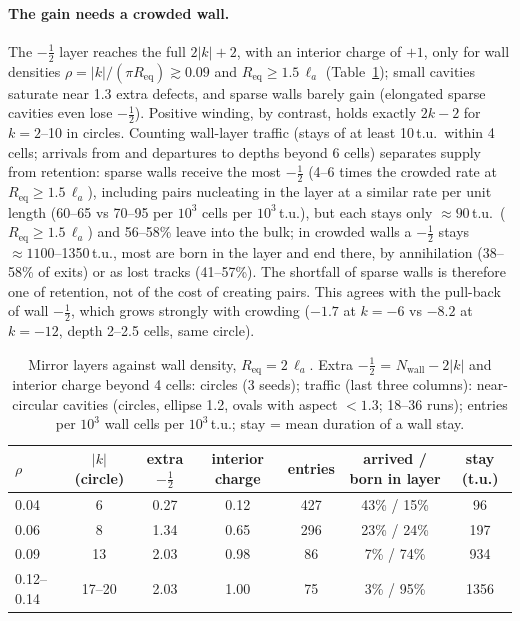 \documentclass[aps,prl,onecolumn,superscriptaddress,amsmath,amssymb,nofootinbib]{revtex4-2}
\newcommand{\half}{\tfrac12}
\newcommand{\la}{\ell_a}
\begin{document}
\paragraph{The gain needs a crowded wall.} The $-\half$ layer reaches the full $2|k|+2$, with an interior charge of $+1$, only for wall densities
$\rho=|k|/(\pi R_\mathrm{eq})\gtrsim0.09$ and $R_\mathrm{eq}\geq1.5\,\la$ (Table~\ref{tab:mirror_rho}); small cavities saturate near 1.3 extra defects, and sparse walls
barely gain (elongated sparse cavities even lose $-\half$). Positive winding, by contrast, holds exactly $2k-2$ for $k=2$--10 in circles. Counting wall-layer traffic
(stays of at least 10\,t.u.\ within 4 cells; arrivals from and departures to depths beyond 6 cells) separates supply from retention: sparse walls receive the
most $-\half$ (4--6 times the crowded rate at $R_\mathrm{eq}\geq1.5\,\la$), including pairs nucleating in the layer at a similar rate per unit length (60--65 vs 70--95 per
$10^3$ cells per $10^3$\,t.u.), but each stays only $\approx90$\,t.u.\ ($R_\mathrm{eq}\geq1.5\,\la$) and 56--58\% leave into the bulk; in crowded walls a $-\half$ stays $\approx1100$--1350\,t.u., most
are born in the layer and end there, by annihilation (38--58\% of exits) or as lost tracks (41--57\%). The shortfall of sparse walls is therefore one of retention, not of the cost of creating pairs. This agrees with the
pull-back of wall $-\half$, which grows strongly with crowding ($-1.7$ at $k=-6$ vs $-8.2$ at $k=-12$, depth 2--2.5 cells, same circle).
\begin{table}[h]\centering\small
\caption{Mirror layers against wall density, $R_\mathrm{eq}=2\,\la$. Extra $-\half$ = $N_\mathrm{wall}-2|k|$ and interior charge beyond 4 cells: circles (3 seeds);
traffic (last three columns): near-circular cavities (circles, ellipse 1.2, ovals with aspect $<1.3$; 18--36 runs); entries per $10^3$ wall cells per $10^3$\,t.u.; stay = mean duration of a wall stay.}\label{tab:mirror_rho}
\begin{tabular}{lcccccc}\hline
$\rho$ & $|k|$ (circle) & extra $-\half$ & interior charge & entries & arrived / born in layer & stay (t.u.)\\\hline
0.04 & 6 & 0.27 & 0.12 & 427 & 43\% / 15\% & 96\\
0.06 & 8 & 1.34 & 0.65 & 296 & 23\% / 24\% & 197\\
0.09 & 13 & 2.03 & 0.98 & 86 & 7\% / 74\% & 934\\
0.12--0.14 & 17--20 & 2.03 & 1.00 & 75 & 3\% / 95\% & 1356\\\hline
\end{tabular}\end{table}
\end{document}
